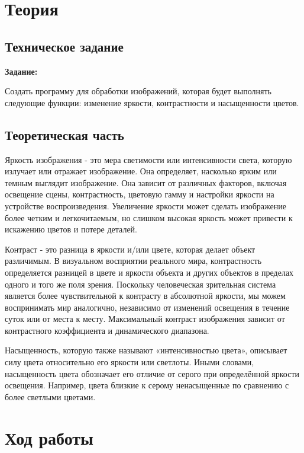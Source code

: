 \documentclass[12pt,a4paper]{scrartcl}
\begin{document}
\large\tableofcontents

\newpage

\section{Теория}
\subsection{Техническое задание}
\textbf {Задание:}

Создать программу для обработки изображений, которая будет выполнять следующие функции: изменение яркости, контрастности и насыщенности цветов.

\subsection{Теоретическая часть} 

Яркость изображения - это мера светимости или интенсивности света, которую излучает или отражает изображение. Она определяет, насколько ярким или темным выглядит изображение. Она зависит от различных факторов, включая освещение сцены, контрастность, цветовую гамму и настройки яркости на устройстве воспроизведения. Увеличение яркости может сделать изображение более четким и легкочитаемым, но слишком высокая яркость может привести к искажению цветов и потере деталей.\textit{}

Контраст - это разница в яркости и/или цвете, которая делает объект различимым. В визуальном восприятии реального мира, контрастность определяется разницей в цвете и яркости объекта и других объектов в пределах одного и того же поля зрения. Поскольку человеческая зрительная система является более чувствительной к контрасту в абсолютной яркости, мы можем воспринимать мир аналогично, независимо от изменений освещения в течение суток или от места к месту. Максимальный контраст изображения зависит от контрастного коэффициента и динамического диапазона.\textit{}

Насыщенность, которую также называют «интенсивностью цвета», описывает силу цвета относительно его яркости или светлоты. Иными словами, насыщенность цвета обозначает его отличие от серого при определённой яркости освещения. Например, цвета близкие к серому ненасыщенные по сравнению с более светлыми цветами.

\newpage

\section{Ход работы}
\label{sec:exp}
\end{document}
